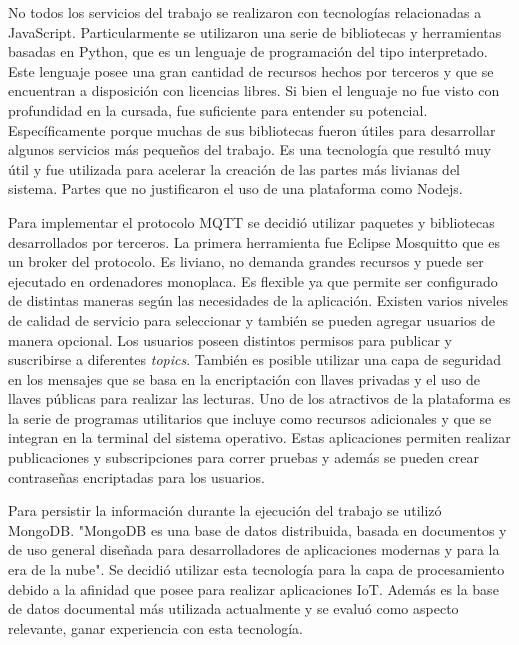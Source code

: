 No todos los servicios del trabajo se realizaron con tecnologías relacionadas a JavaScript.
Particularmente se utilizaron una serie de bibliotecas y herramientas basadas en Python, que es un lenguaje de programación del tipo interpretado.
Este lenguaje posee una gran cantidad de recursos hechos por terceros y que se encuentran a disposición con licencias libres.
Si bien el lenguaje no fue visto con profundidad en la cursada, fue suficiente para entender su potencial.
Específicamente porque muchas de sus bibliotecas fueron útiles para desarrollar algunos servicios más pequeños del trabajo.
Es una tecnología que resultó muy útil y fue utilizada para acelerar la creación de las partes más livianas del sistema.
Partes que no justificaron el uso de una plataforma como Nodejs.

Para implementar el protocolo MQTT se decidió utilizar paquetes y bibliotecas desarrollados por terceros.
La primera herramienta fue Eclipse Mosquitto que es un broker del protocolo.
Es liviano, no demanda grandes recursos y puede ser ejecutado en ordenadores monoplaca.
Es flexible ya que permite ser configurado de distintas maneras según las necesidades de la aplicación.
Existen varios niveles de calidad de servicio para seleccionar y también se pueden agregar usuarios de manera opcional.
Los usuarios poseen distintos permisos para publicar y suscribirse a diferentes \emph{topics}.
También es posible utilizar una capa de seguridad en los mensajes que se basa en la encriptación con llaves privadas y el uso de llaves públicas para realizar las lecturas.
Uno de los atractivos de la plataforma es la serie de programas utilitarios que incluye como recursos adicionales y que se integran en la terminal del sistema operativo.
Estas aplicaciones permiten realizar publicaciones y subscripciones para correr pruebas y además se pueden crear contraseñas encriptadas para los usuarios.

Para persistir la información durante la ejecución del trabajo se utilizó MongoDB.
"MongoDB es una base de datos distribuida, basada en documentos y de uso general diseñada para desarrolladores de aplicaciones modernas y para la era de la nube". \citep{WEBSITE:MongoHome}
Se decidió utilizar esta tecnología para la capa de procesamiento debido a la afinidad que posee para realizar aplicaciones IoT.
Además es la base de datos documental más utilizada actualmente \citep{WEBSITE:DBRanking} y se evaluó como aspecto relevante, ganar experiencia con esta tecnología.

